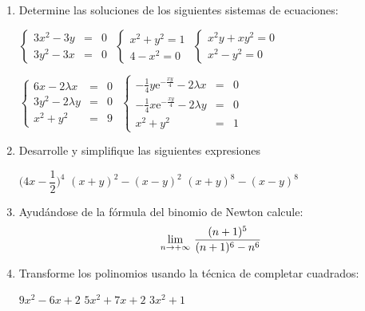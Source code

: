 \begin{enumerate}
\item Determine las soluciones de los siguientes sistemas de ecuaciones:
\setcontadoralph
\begin{centrar}
\nitem
\(\left\lbrace\begin{array}{rcc}
3x^2-3y &=& 0 \\
3y^2-3x &=& 0
\end{array}\right.\)
\hfill
\nitem
\(\left\lbrace\begin{array}{l}
x^2+y^2=1 \\
4-x^2=0
\end{array}\right.\) 
\hfill
\nitem
\(\left\lbrace\begin{array}{l}
x^2y+xy^2 = 0 \\
x^2-y^2=0
\end{array}\right.\)
\end{centrar}
\begin{centrar}
\nitem
\(\left\lbrace\begin{array}{rcc}
6x-2\lambda x &=& 0 \\
3y^2-2\lambda y &=& 0 \\
x^2+y^2 & = & 9
\end{array}\right.\)
\hfill
\nitem
\(\left\lbrace\begin{array}{rcc}
-\frac14 y\mbox{e}^{-\frac{xy}4}-2\lambda x &=& 0 \\
-\frac14 x\mbox{e}^{-\frac{xy}4}-2\lambda y &=& 0 \\
x^2+y^2 & = & 1
\end{array}\right.\)
\end{centrar}


\item
Desarrolle y simplifique las siguientes expresiones
\setcontadoralph
\begin{centrar}
\nitem
$\Big(4x-\dfrac12\Big)^4$ \hfill
\hfill
\nitem
$(x+y)^2-(x-y)^2$\hfill
\hfill
\nitem
$(x+y)^8-(x-y)^8$
\end{centrar}



\item
Ayudándose de la fórmula del binomio de Newton calcule: 
\[
\lm[n]{+\infty}\dfrac{(n+1)^5}{(n+1)^6-n^6}
\]


\item
Transforme los polinomios usando la técnica de completar cuadrados:
\setcontadoralph
\begin{centrar}
\nitem
$9x^2-6x+2$ \hfill
\hfill
\nitem
$5x^2+7x+2$\hfill
\hfill
\nitem
$3x^2+1$
\end{centrar}


\end{enumerate}



